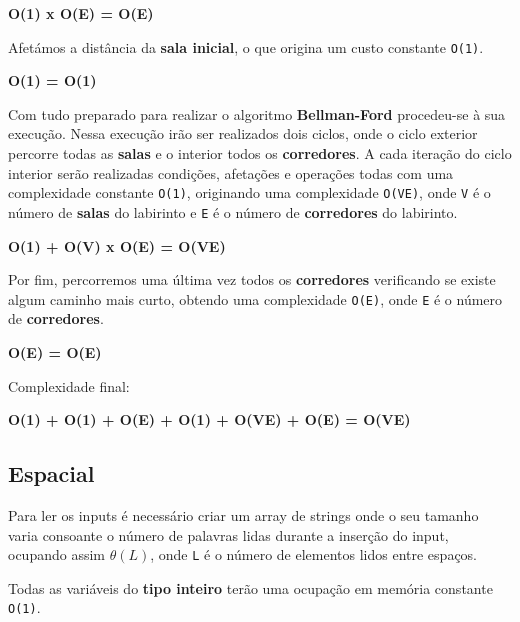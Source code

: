 \documentclass[11pt]{article}
\begin{document}
\begin{center}
    \textbf{O(1) x O(E) = O(E)}
\end{center}

Afetámos a distância da \textbf{sala inicial}, o que origina um custo constante \verb|O(1)|.

\begin{center}
    \textbf{O(1) = O(1)}
\end{center}

Com tudo preparado para realizar o algoritmo \textbf{Bellman-Ford} procedeu-se à sua execução.
Nessa execução irão ser realizados dois ciclos, onde o ciclo exterior percorre todas as \textbf{salas}
e o interior todos os \textbf{corredores}. A cada iteração do ciclo interior serão realizadas
condições, afetações e operações todas com uma complexidade constante \verb|O(1)|, originando uma
complexidade \verb|O(VE)|, onde \verb|V| é o número de \textbf{salas} do
labirinto e \verb|E| é o número de \textbf{corredores} do labirinto.

\begin{center}
    \textbf{O(1) + O(V) x O(E) = O(VE)}
\end{center}

Por fim, percorremos uma última vez todos os \textbf{corredores} verificando se existe algum caminho
mais curto, obtendo uma complexidade \verb|O(E)|, onde \verb|E| é o número de \textbf{corredores}.

\begin{center}
    \textbf{O(E) = O(E)}
\end{center}

Complexidade final:

\begin{center}
    \textbf{O(1) + O(1) + O(E) + O(1) + O(VE) + O(E) = O(VE)}
\end{center}

\subsection{Espacial}

\hspace{0,5cm} Para ler os inputs é necessário criar um array de strings onde o seu tamanho
varia consoante o número de palavras lidas durante a inserção do input, ocupando assim $\theta(L)$,
onde \verb|L| é o número de elementos lidos entre espaços.

Todas as variáveis do \textbf{tipo inteiro} terão uma ocupação em memória constante \verb|O(1)|.
\end{document}
